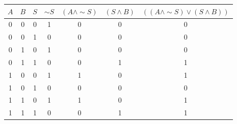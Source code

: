 \begin{tabular}{|c|c|c||c|c|c|c|}
\hline
$ A $ & $ B $ & $ S $ & $  \sim S $ & $ (A \wedge  \sim S) $ & $ (S \wedge B) $ & $ ((A \wedge  \sim S) \vee (S \wedge B)) $ \\
\hline
0 & 0 & 0 & 1 & 0 & 0 & 0 \\
0 & 0 & 1 & 0 & 0 & 0 & 0 \\
0 & 1 & 0 & 1 & 0 & 0 & 0 \\
0 & 1 & 1 & 0 & 0 & 1 & 1 \\
1 & 0 & 0 & 1 & 1 & 0 & 1 \\
1 & 0 & 1 & 0 & 0 & 0 & 0 \\
1 & 1 & 0 & 1 & 1 & 0 & 1 \\
1 & 1 & 1 & 0 & 0 & 1 & 1 \\
\hline
\end{tabular}
